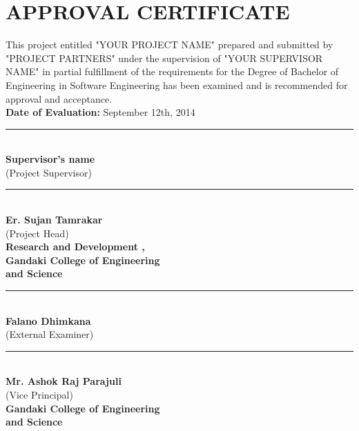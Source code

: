 
\section*{\center APPROVAL CERTIFICATE}

		This project entitled "YOUR PROJECT NAME" prepared and submitted by "PROJECT PARTNERS" under the supervision of "YOUR SUPERVISOR NAME" in partial fulfillment of the requirements for the Degree of Bachelor of Engineering in Software Engineering has been examined and is recommended for approval and acceptance.\\
\linebreak
\textbf{Date of Evaluation:} September 12th, 2014\\
\linebreak

\begin{multicols}{2}
	
	\noindent\rule{6cm}{0.1pt}\\
	\textbf{Supervisor's name} \\
	(Project Supervisor)\\
	\linebreak
	
		\noindent\rule{6cm}{0.1pt}\\
	\textbf{Er. Sujan Tamrakar} \\
	(Project Head) \\
	\textbf{Research and Development ,} \\
	\textbf{Gandaki College of Engineering\\ and Science}
	
	\columnbreak
	
	\noindent\rule{6cm}{0.1pt}\\
	\textbf{Falano Dhimkana} \\
	(External Examiner) \\ 
	\linebreak
	 
	\noindent\rule{6cm}{0.1pt}\\
	\textbf{Mr. Ashok Raj Parajuli} \\
	(Vice Principal) \\
	\textbf{Gandaki College of Engineering\\  and Science}\\
	
	
	
	                   
\end{multicols} 
	
	
	



